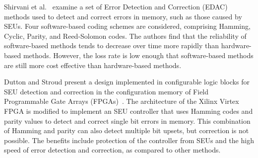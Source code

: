 Shirvani et al.~\cite{Shirvani2001EDAC} examine a set of Error Detection and Correction (EDAC) methods used to detect and correct errors in memory, such as those caused by SEUs. 
Four software-based coding schemes are considered, comprising Hamming, Cyclic, Parity, and Reed-Solomon codes. The authors find that the reliability of software-based methods tends to decrease over time more rapidly than hardware-based methods. However, the loss rate is low enough that software-based methods are still more cost effective than hardware-based methods.  

Dutton and Stroud present a design implemented in configurable logic blocks for SEU detection and correction in the configuration memory of Field Programmable Gate Arrays (FPGAs)~\cite{CATA09seuonVirtex}. The architecture of the Xilinx Virtex FPGA is modified to implement an SEU controller that uses Hamming codes and parity values to detect and correct single bit errors in memory. This combination of Hamming and parity can also detect multiple bit upsets, but correction is not possible. The benefits include protection of the controller from SEUs and the high speed of error detection and correction, as compared to other methods.




